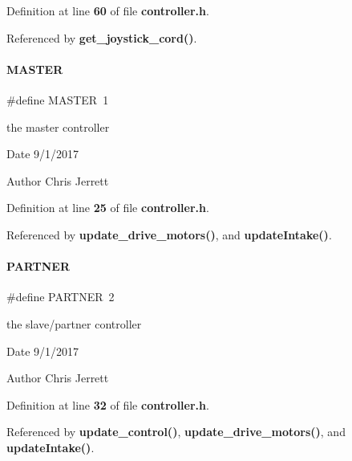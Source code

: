 Definition at line \textbf{ 60} of file \textbf{ controller.\+h}.



Referenced by \textbf{ get\+\_\+joystick\+\_\+cord()}.

\mbox{\label{controller_8h_a3fa2d3bf1901157f734a584d47b25d8b}} 
\paragraph{M\+A\+S\+T\+ER}
{\footnotesize\ttfamily \#define M\+A\+S\+T\+ER~1}



the master controller 

\begin{DoxyDate}{Date}
9/1/2017 
\end{DoxyDate}
\begin{DoxyAuthor}{Author}
Chris Jerrett 
\end{DoxyAuthor}


Definition at line \textbf{ 25} of file \textbf{ controller.\+h}.



Referenced by \textbf{ update\+\_\+drive\+\_\+motors()}, and \textbf{ update\+Intake()}.

\mbox{\label{controller_8h_a136e64cf351535da81cacb6a546cade6}} 
\paragraph{P\+A\+R\+T\+N\+ER}
{\footnotesize\ttfamily \#define P\+A\+R\+T\+N\+ER~2}



the slave/partner controller 

\begin{DoxyDate}{Date}
9/1/2017 
\end{DoxyDate}
\begin{DoxyAuthor}{Author}
Chris Jerrett 
\end{DoxyAuthor}


Definition at line \textbf{ 32} of file \textbf{ controller.\+h}.



Referenced by \textbf{ update\+\_\+control()}, \textbf{ update\+\_\+drive\+\_\+motors()}, and \textbf{ update\+Intake()}.

